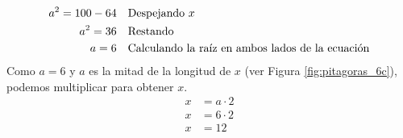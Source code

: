 \begin{solutionbox}{13cm}
\begin{minipage}{0.75\textwidth}
\begin{align*}
            a^2=100-64                                                      & \text{\quad Despejando } x                                    \\
            a^2=36                                                          & \text{\quad Restando}                                         \\
            a=6                                                             & \text{\quad Calculando la raíz en ambos lados de la ecuación} \\
        \end{align*}
        Como $a=6$ y $a$ es la mitad de la longitud de $x$ (ver Figura \ref{fig:pitagoras_6c}), podemos multiplicar para obtener $x$.
        \begin{align*}
            x & = a\cdot 2 \\
            x & = 6\cdot 2 \\
            x & = 12       \\
        \end{align*}
    \end{minipage}
\end{solutionbox}
